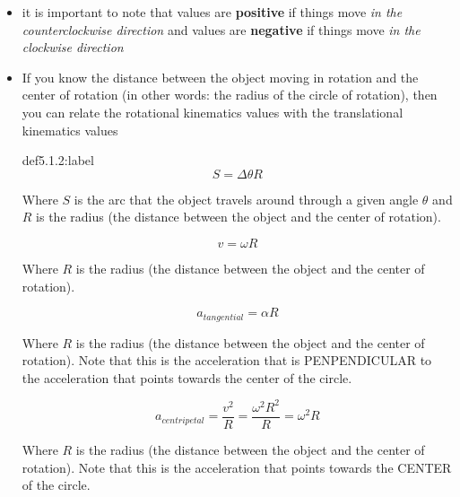 \begin{itemize}
\begin{definition}{def5.1.1:label}
        \[
        \begin{aligned}
            \omega_f &= \omega_i + \alpha t\\
            \Delta\theta &= \omega_it + \frac{1}{2}\alpha t^2\\
            \omega_f^2 &= \omega_i^2 + 2\alpha\Delta\theta
        \end{aligned}    
        \]
    \end{definition}

    \item it is important to note that values are \textbf{positive} if things move \textit{in the counterclockwise direction} and values are \textbf{negative} if things move \textit{in the clockwise direction}
    \item If you know the distance between the object moving in rotation and the center of rotation (in other words: the radius of the circle of rotation), then you can relate the rotational kinematics values with the translational kinematics values
    
    \begin{definition}{def5.1.2:label}
        \[
        S = \Delta\theta R    
        \]

        Where $S$ is the arc that the object travels around through a given angle $\theta$ and $R$ is the radius (the distance between the object and the center of rotation).

        \[
        v = \omega R    
        \]

        Where $R$ is the radius (the distance between the object and the center of rotation).

        \[
        a_{tangential} = \alpha R    
        \]

        Where $R$ is the radius (the distance between the object and the center of rotation). Note that this is the acceleration that is PENPENDICULAR to the acceleration that points towards the center of the circle.

        \[
        a_{centripetal} = \frac{v^2}{R} = \frac{\omega^2 R^2}{R} = \omega^2 R    
        \]

        Where $R$ is the radius (the distance between the object and the center of rotation). Note that this is the acceleration that points towards the CENTER of the circle. 
    \end{definition}
\end{itemize}


